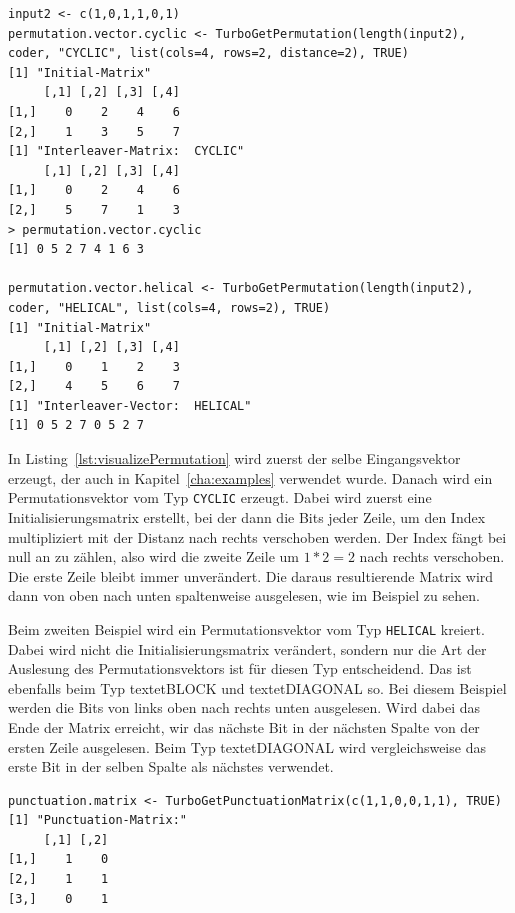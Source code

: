\begin{lstlisting}[caption=Visualisierung der Permutationsmatrix, label={lst:visualizePermutation}, float=th]
input2 <- c(1,0,1,1,0,1)
permutation.vector.cyclic <- TurboGetPermutation(length(input2), coder, "CYCLIC", list(cols=4, rows=2, distance=2), TRUE)
[1] "Initial-Matrix"
     [,1] [,2] [,3] [,4]
[1,]    0    2    4    6
[2,]    1    3    5    7
[1] "Interleaver-Matrix:  CYCLIC"
     [,1] [,2] [,3] [,4]
[1,]    0    2    4    6
[2,]    5    7    1    3
> permutation.vector.cyclic
[1] 0 5 2 7 4 1 6 3

permutation.vector.helical <- TurboGetPermutation(length(input2), coder, "HELICAL", list(cols=4, rows=2), TRUE)
[1] "Initial-Matrix"
     [,1] [,2] [,3] [,4]
[1,]    0    1    2    3
[2,]    4    5    6    7
[1] "Interleaver-Vector:  HELICAL"
[1] 0 5 2 7 0 5 2 7
\end{lstlisting}

In Listing~\ref{lst:visualizePermutation} wird zuerst der selbe Eingangsvektor erzeugt, der auch in Kapitel~\ref{cha:examples} verwendet wurde. Danach wird ein Permutationsvektor vom Typ \texttt{CYCLIC} erzeugt. Dabei wird zuerst eine Initialisierungsmatrix erstellt, bei der dann die Bits jeder Zeile, um den Index multipliziert mit der Distanz nach rechts verschoben werden. Der Index fängt bei null an zu zählen, also wird die zweite Zeile um $1*2 = 2$ nach rechts verschoben. Die erste Zeile bleibt immer unverändert. Die daraus resultierende Matrix wird dann von oben nach unten spaltenweise ausgelesen, wie im Beispiel zu sehen.

Beim zweiten Beispiel wird ein Permutationsvektor vom Typ \texttt{HELICAL} kreiert. Dabei wird nicht die Initialisierungsmatrix verändert, sondern nur die Art der Auslesung des Permutationsvektors ist für diesen Typ entscheidend. Das ist ebenfalls beim Typ textet{BLOCK} und textet{DIAGONAL} so. Bei diesem Beispiel werden die Bits von links oben nach rechts unten ausgelesen. Wird dabei das Ende der Matrix erreicht, wir das nächste Bit in der nächsten Spalte von der ersten Zeile ausgelesen. Beim Typ textet{DIAGONAL} wird vergleichsweise das erste Bit in der selben Spalte als nächstes verwendet.

\begin{lstlisting}[caption=Visualisierung der Punktierungssmatrix, label={lst:visualizePunctuationMatrix}, float=th]
punctuation.matrix <- TurboGetPunctuationMatrix(c(1,1,0,0,1,1), TRUE)
[1] "Punctuation-Matrix:"
     [,1] [,2]
[1,]    1    0
[2,]    1    1
[3,]    0    1
\end{lstlisting}

